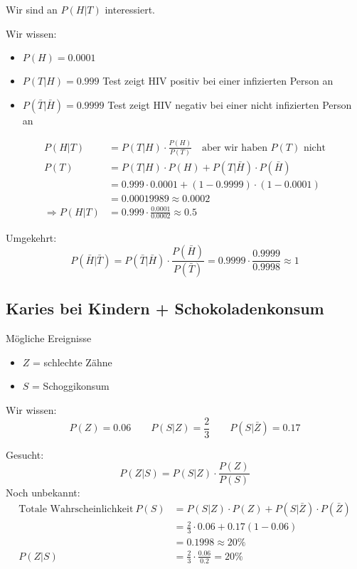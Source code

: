 \documentclass[10pt,a4paper]{scrartcl}
\begin{document}
Wir sind an $P(H|T)$ interessiert.

Wir wissen:
\begin{itemize}
\item $P(H) = 0.0001$
\item $P(T|H) = 0.999$ Test zeigt HIV positiv bei einer infizierten Person an
\item $P(\bar{T}|\bar{H}) = 0.9999$ Test zeigt HIV negativ bei einer nicht infizierten Person an
\end{itemize}

\begin{align*} %
P(H|T) &= P(T|H) \cdot \frac{P(H)}{P(T)} \quad\mbox{aber wir haben } P(T) \mbox{ nicht} \\
P(T) &= P(T|H) \cdot P(H) + P(T|\bar{H}) \cdot P(\bar{H}) \\
	 &= 0.999 \cdot 0.0001 + (1-0.9999) \cdot (1-0.0001) \\
	 &= 0.00019989 \approx 0.0002 \\
\Rightarrow P(H|T) &= 0.999 \cdot \frac{0.0001}{0.0002} \approx 0.5
\end{align*}

Umgekehrt:
$$P(\bar{H}|\bar{T}) = P(\bar{T}|\bar{H}) \cdot \frac{P(\bar{H})}{P(\bar{T})}
 = 0.9999 \cdot \frac{0.9999}{0.9998} \approx 1$$

\subsection{Karies bei Kindern + Schokoladenkonsum}
Mögliche Ereignisse
\begin{itemize}
\item $Z$ = {schlechte Zähne}
\item $S$ = {Schoggikonsum}
\end{itemize}

Wir wissen:
$$P(Z) = 0.06 \qquad P(S|Z) = \frac{2}{3} \qquad P(S|\bar{Z}) = 0.17$$

Gesucht: $$P(Z|S) = P(S|Z) \cdot \frac{P(Z)}{P(S)}$$
Noch unbekannt: 
\begin{align*}
\mbox{Totale Wahrscheinlichkeit} \ P(S) & = P(S|Z) \cdot P(Z) + P(S|\bar{Z}) \cdot P(\bar{Z}) \\
 & = \frac{2}{3} \cdot 0.06 + 0.17 (1-0.06) \\
 & = 0.1998 \approx 20\% \\
 P(Z|S) &= \frac{2}{3} \cdot \frac{0.06}{0.2} = 20\%
\end{align*}
\end{document}
